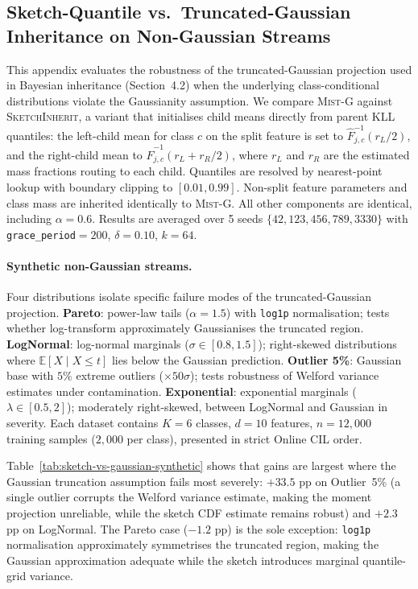 \documentclass{article}
\newcommand{\mist}{\textsc{Mist}}
\begin{document}
\subsection{Sketch-Quantile vs.\ Truncated-Gaussian Inheritance on Non-Gaussian Streams}
\label{app:sketch-vs-gaussian}

This appendix evaluates the robustness of the truncated-Gaussian projection
used in Bayesian inheritance (Section~4.2) when the underlying class-conditional
distributions violate the Gaussianity assumption. We compare \mist{}-G against
\textsc{SketchInherit}, a variant that initialises child means directly from
parent KLL quantiles: the left-child mean for class $c$ on the split feature
is set to $\widehat{F}_{j,c}^{-1}(r_L/2)$, and the right-child mean to
$\widehat{F}_{j,c}^{-1}(r_L + r_R/2)$, where $r_L$ and $r_R$ are the
estimated mass fractions routing to each child. Quantiles are resolved by
nearest-point lookup with boundary clipping to $[0.01, 0.99]$. Non-split
feature parameters and class mass are inherited identically to \mist{}-G.
All other components are identical, including $\alpha{=}0.6$. Results
are averaged over 5 seeds $\{42, 123, 456, 789, 3330\}$ with
\texttt{grace\_period}$=200$, $\delta=0.10$, $k=64$.

\paragraph{Synthetic non-Gaussian streams.}
Four distributions isolate specific failure modes of the truncated-Gaussian
projection. \textbf{Pareto}: power-law tails ($\alpha{=}1.5$) with
\texttt{log1p} normalisation; tests whether log-transform approximately
Gaussianises the truncated region. \textbf{LogNormal}: log-normal marginals
($\sigma \in [0.8, 1.5]$); right-skewed distributions where
$\mathbb{E}[X \mid X \leq t]$ lies below the Gaussian prediction.
\textbf{Outlier 5\%}: Gaussian base with $5\%$ extreme outliers
(${\times}50\sigma$); tests robustness of Welford variance estimates under
contamination. \textbf{Exponential}: exponential marginals
($\lambda \in [0.5, 2]$); moderately right-skewed, between LogNormal and
Gaussian in severity. Each dataset contains $K{=}6$ classes, $d{=}10$
features, $n{=}12{,}000$ training samples ($2{,}000$ per class), presented
in strict Online CIL order.

Table~\ref{tab:sketch-vs-gaussian-synthetic} shows that gains are largest
where the Gaussian truncation assumption fails most severely: $+33.5$ pp on
Outlier~5\% (a single outlier corrupts the Welford variance estimate, making
the moment projection unreliable, while the sketch CDF estimate remains
robust) and $+2.3$ pp on LogNormal. The Pareto case ($-1.2$ pp) is the sole
exception: \texttt{log1p} normalisation approximately symmetrises the
truncated region, making the Gaussian approximation adequate while the
sketch introduces marginal quantile-grid variance.
\end{document}
